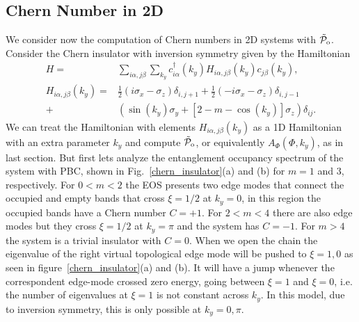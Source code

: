 \documentclass[twocolumn,amsmath,longbibliography,amssymb,superscriptaddress]{revtex4-1}
\newcommand{\tpo}{\tilde{\mathcal{P}}_{\rm o}}
\begin{document}
\subsection{Chern Number in 2D}
%
We consider now the computation of Chern numbers in 2D systems with $\tpo$. Consider the Chern insulator with inversion symmetry given by the Hamiltonian
\begin{align}
H =& \sum_{i\alpha,j\beta}\sum_{k_y} c_{i\alpha}^\dagger(k_y) H_{i\alpha,j\beta}(k_y) c_{j\beta}(k_y), \\
H_{i\alpha,j\beta}(k_y)=& \frac{1}{2}(i\sigma_x-\sigma_z)\delta_{i,j+1}+\frac{1}{2}(-i\sigma_x-\sigma_z)\delta_{i,j-1} \nonumber\\
+&(\sin(k_y)\sigma_y+[2-m-\cos(k_y)]\sigma_z) \delta_{ij}.
\end{align}
We can treat the Hamiltonian with elements $H_{i\alpha,j\beta}(k_y)$ as a 1D Hamiltonian with an extra parameter $k_y$ and compute $\tpo$, or equivalently $A_\Phi(\Phi,k_y)$, as in last section. But first lets analyze the entanglement occupancy spectrum of the system with PBC, shown in Fig.~\ref{chern_insulator}(a) and (b) for $m=1$ and $3$, respectively. For $0<m<2$ the EOS presents two edge modes that connect the occupied and empty bands that cross $\xi=1/2$ at $k_y=0$, in this region the occupied bands have a Chern number $C=+1$. For $2<m<4$ there are also edge modes but they cross $\xi=1/2$ at $k_y=\pi$ and the system has $C=-1$. For $m>4$ the system is a trivial insulator with $C=0$. When we open the chain the eigenvalue of the right virtual topological edge mode will be pushed to $\xi=1,0$ as seen in figure~\ref{chern_insulator}(a) and (b). It will have a jump whenever the correspondent edge-mode crossed zero energy, going between $\xi=1$ and $\xi=0$, i.e. the number of eigenvalues at $\xi = 1$ is not constant across $k_y$. In this model, due to inversion symmetry, this is only possible at $k_y=0,\pi$. 
\end{document}
